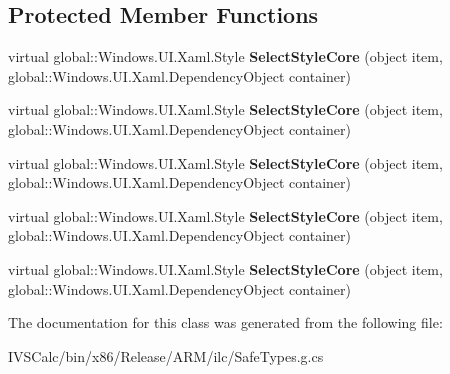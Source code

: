 \subsection*{Protected Member Functions}
\begin{DoxyCompactItemize}
\item 
\mbox{\label{class_windows_1_1_u_i_1_1_xaml_1_1_controls_1_1_style_selector_af50a14273218222381f7f81e0746c5bb}} 
virtual global\+::\+Windows.\+U\+I.\+Xaml.\+Style {\bfseries Select\+Style\+Core} (object item, global\+::\+Windows.\+U\+I.\+Xaml.\+Dependency\+Object container)
\item 
\mbox{\label{class_windows_1_1_u_i_1_1_xaml_1_1_controls_1_1_style_selector_af50a14273218222381f7f81e0746c5bb}} 
virtual global\+::\+Windows.\+U\+I.\+Xaml.\+Style {\bfseries Select\+Style\+Core} (object item, global\+::\+Windows.\+U\+I.\+Xaml.\+Dependency\+Object container)
\item 
\mbox{\label{class_windows_1_1_u_i_1_1_xaml_1_1_controls_1_1_style_selector_af50a14273218222381f7f81e0746c5bb}} 
virtual global\+::\+Windows.\+U\+I.\+Xaml.\+Style {\bfseries Select\+Style\+Core} (object item, global\+::\+Windows.\+U\+I.\+Xaml.\+Dependency\+Object container)
\item 
\mbox{\label{class_windows_1_1_u_i_1_1_xaml_1_1_controls_1_1_style_selector_af50a14273218222381f7f81e0746c5bb}} 
virtual global\+::\+Windows.\+U\+I.\+Xaml.\+Style {\bfseries Select\+Style\+Core} (object item, global\+::\+Windows.\+U\+I.\+Xaml.\+Dependency\+Object container)
\item 
\mbox{\label{class_windows_1_1_u_i_1_1_xaml_1_1_controls_1_1_style_selector_af50a14273218222381f7f81e0746c5bb}} 
virtual global\+::\+Windows.\+U\+I.\+Xaml.\+Style {\bfseries Select\+Style\+Core} (object item, global\+::\+Windows.\+U\+I.\+Xaml.\+Dependency\+Object container)
\end{DoxyCompactItemize}


The documentation for this class was generated from the following file\+:\begin{DoxyCompactItemize}
\item 
I\+V\+S\+Calc/bin/x86/\+Release/\+A\+R\+M/ilc/Safe\+Types.\+g.\+cs\end{DoxyCompactItemize}
